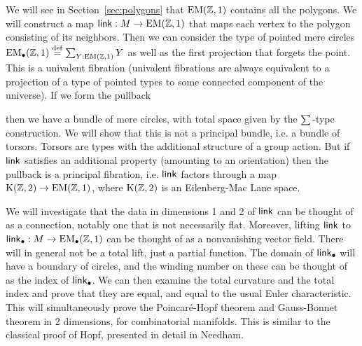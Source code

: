 We will see in Section~\ref{sec:polygons} that \( \mathrm{EM}(\mathbb{Z},1) \) contains all the polygons. We will construct a map \( \mathsf{link}:M\to\mathrm{EM}(\mathbb{Z},1) \) that maps each vertex to the polygon consisting of its neighbors. Then we can consider the type of pointed mere circles \( \mathrm{EM_{\bullet}}(\mathbb{Z},1)\stackrel{\mathrm{def}}{=} \sum_{Y:\mathrm{EM}(\mathbb{Z},1)}Y \) as well as the first projection that forgets the point. This is a univalent fibration (univalent fibrations are always equivalent to a projection of a type of pointed types to some connected component of the universe\cite{christensen_univalence}). If we form the pullback
\begin{center}
\end{center}
then we have a bundle of mere circles, with total space given by the \( \sum_{} \)-type construction. We will show that this is not a principal bundle, i.e. a bundle of torsors. Torsors are types with the additional structure of a group action. But if \( \mathsf{link}  \) satisfies an additional property (amounting to an orientation) then the pullback is a principal fibration, i.e. \( \mathsf{link} \) factors through a map \( \mathrm{K}(\mathbb{Z},2)\to\mathrm{EM}(\mathbb{Z},1) \), where \( \mathrm{K}(\mathbb{Z},2) \) is an Eilenberg-Mac Lane space. 

We will investigate that the data in dimensions 1 and 2 of \( \mathsf{link} \) can be thought of as a connection, notably one that is not necessarily flat. Moreover, lifting \( \mathsf{link} \) to \( \mathsf{link}_\bullet:M\to\mathrm{EM_{\bullet}}(\mathbb{Z},1) \) can be thought of as a nonvanishing vector field. There will in general not be a total lift, just a partial function. The domain of \( \mathsf{link}_\bullet \) will have a boundary of circles, and the winding number on these can be thought of as the index of \( \mathsf{link}_\bullet \). We can then examine the total curvature and the total index and prove that they are equal, and equal to the usual Euler characteristic. This will simultaneously prove the Poincaré-Hopf theorem and Gauss-Bonnet theorem in 2 dimensions, for combinatorial manifolds. This is similar to the classical proof of Hopf\cite{hopf}, presented in detail in Needham\cite{needham}.

